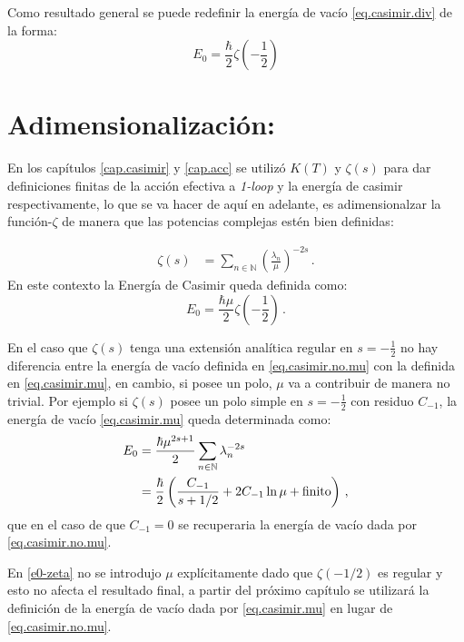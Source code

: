 \bigskip

Como resultado general se puede redefinir la energía de vacío \ref{eq.casimir.div} de la forma:
\begin{equation}
E _0 = \frac{\hbar}{2} \zeta  \left (- \frac{1}{2} \right) 
\label{eq.casimir.no.mu}
\end{equation}

\bigskip

\section{Adimensionalización:}
\label{seq.adim}

\medskip

En los capítulos \ref{cap.casimir} y \ref{cap.acc} se utilizó $K(T)$ y $\zeta (s)$ para dar definiciones finitas de la acción efectiva a {\it 1-loop} y la energía de casimir respectivamente, lo que se va hacer de aquí en adelante, es adimensionalzar la función-$\zeta$ de manera que las potencias complejas estén bien definidas:

\begin{align}
\zeta  (s) &= \sum\limits_{n \in \mathbb N} \left( \frac{\lambda  _n}{\mu }  \right) ^{-2s } \label{def.adim} \, .
\end{align}
En este contexto la Energía de Casimir queda definida como:
\begin{equation}
E _0 = \frac{\hbar \mu}{2} \zeta  \left( - \frac{1}{2} \right) \,.
\label{eq.casimir.mu}
\end{equation}

En el caso que $\zeta (s)$ tenga una extensión analítica regular en $s=-\frac{1}{2}$ no hay diferencia entre la energía de vacío definida en \eqref{eq.casimir.no.mu} con la definida en \eqref{eq.casimir.mu}, en cambio, si posee un polo, $\mu$ va a contribuir de manera no trivial. Por ejemplo si $\zeta (s) $ posee un polo simple en $s= - \frac{1}{2}$ con residuo $C _{-1}$, la energía de vacío  \eqref{eq.casimir.mu} queda determinada como:
\begin{equation}
\begin{aligned}
E _0 &= 
\frac{\hbar \mu ^{2s+1}}{2} 
\sum\limits_{n \in \mathbb N}  \lambda _n   ^{-2s } \\ &= 
\frac{\hbar }{2} 
\left(
		\frac{C _{-1}}{  s+1/2 } + 2 C _{-1} \ln \mu + {\rm finito} 
		\right) 
\, ,
\end{aligned}
\end{equation}
que en el caso de que $C _{-1} = 0 $ se recuperaria la energía de vacío dada por \eqref{eq.casimir.no.mu}.


En \ref{e0-zeta} no se introdujo $\mu$ explícitamente dado que $\zeta (-1/2)$ es regular y esto no afecta el resultado final, a partir del próximo capítulo se utilizará la definición de la energía de vacío dada por \ref{eq.casimir.mu} en lugar de \ref{eq.casimir.no.mu}.